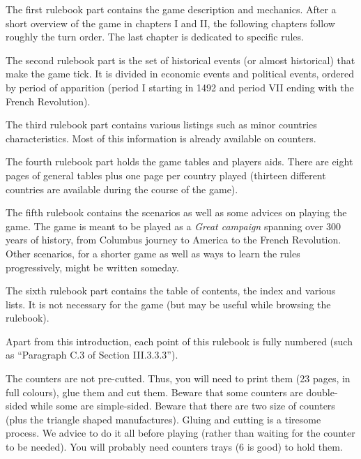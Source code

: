 The first rulebook part contains the game description and mechanics. After a
short overview of the game in chapters I and II, the following chapters follow
roughly the turn order. The last chapter is dedicated to specific rules.

The second rulebook part is the set of historical events (or almost
historical) that make the game tick. It is divided in economic events and
political events, ordered by period of apparition (period I starting in 1492
and period VII ending with the French Revolution).

The third rulebook part contains various listings such as minor countries
characteristics. Most of this information is already available on
counters.

The fourth rulebook part holds the game tables and players aids. There are
eight pages of general tables plus one page per country played (thirteen
different countries are available during the course of the game).

The fifth rulebook contains the scenarios as well as some advices on playing
the game. The game is meant to be played as a \emph{Great campaign} spanning
over 300 years of history, from Columbus journey to America to the French
Revolution. Other scenarios, for a shorter game as well as ways to learn the
rules progressively, might be written someday.

The sixth rulebook part contains the table of contents, the index and various
lists. It is not necessary for the game (but may be useful while browsing the
rulebook).

Apart from this introduction, each point of this rulebook is fully numbered
(such as ``Paragraph C.3 of Section III.3.3.3'').

The counters are not pre-cutted. Thus, you will need to print them (23 pages,
in full colours), glue them and cut them. Beware that some counters are
double-sided while some are simple-sided. Beware that there are two size of
counters (plus the triangle shaped manufactures). Gluing and cutting is a
tiresome process. We advice to do it all before playing (rather than waiting
for the counter to be needed). You will probably need counters trays (6 is
good) to hold them.


